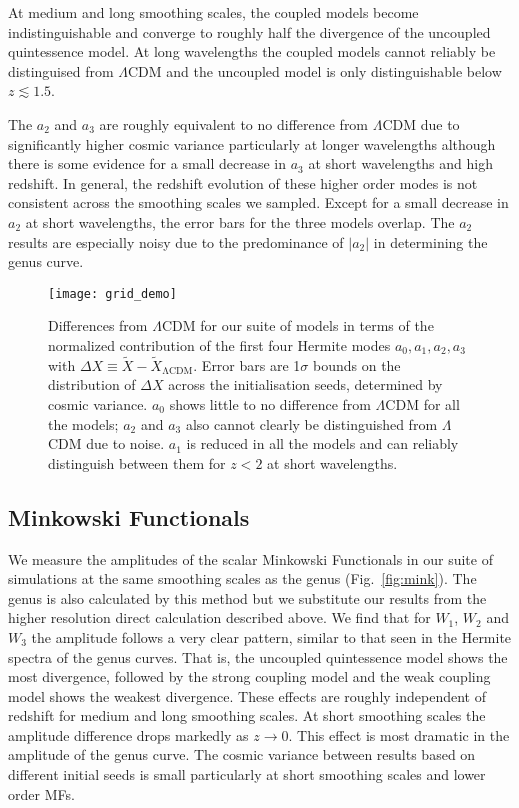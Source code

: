 \documentclass[a4paper,fleqn,usenatbib]{mnras}
\begin{document}
At medium and long smoothing scales, the coupled models become indistinguishable and converge to roughly half the divergence of the uncoupled quintessence model. At long wavelengths the coupled models cannot reliably be distinguised from $\Lambda$CDM and the uncoupled model is only distinguishable below $z \lesssim 1.5$. 

The $a_2$ and $a_3$ are roughly equivalent to no difference from $\Lambda$CDM due to significantly higher cosmic variance particularly at longer wavelengths although there is some evidence for a small decrease in $a_3$ at short wavelengths and high redshift. In general, the redshift evolution of these higher order modes is not consistent across the smoothing scales we sampled. Except for a small decrease in $a_2$ at short wavelengths, the error bars for the three models overlap. The $a_2$ results are especially noisy due to the predominance of $|a_2|$ in determining the genus curve.

 \begin{figure*}
	\texttt{[image: grid\_demo]}
    \caption{Differences from $\Lambda$CDM for our suite of models in terms of the normalized contribution of the first four Hermite modes $a_0, a_1, a_2, a_3$ with $\Delta X \equiv \tilde{X}-\tilde{X}_{\mathrm{\Lambda CDM}}$. Error bars are 1$\sigma$ bounds on the distribution of $\Delta X$ across the initialisation seeds, determined by cosmic variance. $a_0$ shows little to no difference from $\Lambda$CDM for all the models; $a_2$ and $a_3$ also cannot clearly be distinguished from $\Lambda$CDM due to noise. $a_1$ is reduced in all the models and can reliably distinguish between them for $z<2$ at short wavelengths.}
    \label{fig:herm}
 \end{figure*}


\subsection{Minkowski Functionals}
\label{subsec:minkfunc_results}

We measure the amplitudes of the scalar Minkowski Functionals in our suite of simulations at the same smoothing scales as the genus (Fig.~\ref{fig:mink}). The genus is also calculated by this method but we substitute our results from the higher resolution direct calculation described above. We find that for $W_1$, $W_2$ and $W_3$ the amplitude follows a very clear pattern, similar to that seen in the Hermite spectra of the genus curves. That is, the uncoupled quintessence model shows the most divergence, followed by the strong coupling model and the weak coupling model shows the weakest divergence. These effects are roughly independent of redshift for medium and long smoothing scales. At short smoothing scales the amplitude difference drops markedly as $z \to 0$. This effect is most dramatic in the amplitude of the genus curve. The cosmic variance between results based on different initial seeds is small particularly at short smoothing scales and lower order MFs.
\end{document}
